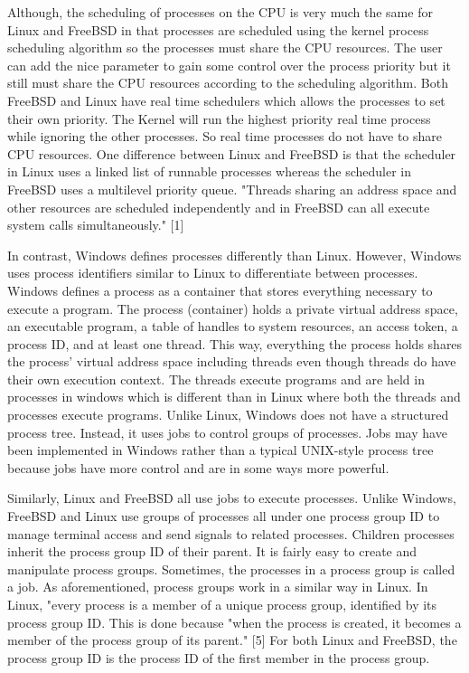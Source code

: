 \documentclass[letterpaper,10pt,draftclsnofoot,onecolumn,]{IEEEtran}
\begin{document}
Although, the scheduling of processes on the CPU is very much the same for Linux and FreeBSD in that processes are scheduled using the kernel process scheduling algorithm so the processes must share the CPU resources. The user can add the nice parameter to gain some control over the process priority but it still must share the CPU resources according to the scheduling algorithm. Both FreeBSD and Linux have real time schedulers which allows the processes to set their own priority. The Kernel will run the highest priority real time process while ignoring the other processes. So real time processes do not have to share CPU resources. One difference between Linux and FreeBSD is that the scheduler in Linux uses a linked list of runnable processes whereas the scheduler in FreeBSD uses a multilevel priority queue. "Threads sharing an address space and other resources are scheduled independently and in FreeBSD can all execute system calls simultaneously." [1] 

In contrast, Windows defines processes differently than Linux. However, Windows uses process identifiers similar to Linux to differentiate between processes. Windows defines a process as a container that stores everything necessary to execute a program. The process (container) holds a private virtual address space, an executable program, a table of handles to system resources, an access token, a process ID, and at least one thread. This way, everything the process holds shares the process' virtual address space including threads even though threads do have their own execution context. The threads execute programs and are held in processes in windows which is different than in Linux where both the threads and processes execute programs. Unlike Linux, Windows does not have a structured process tree. Instead, it uses jobs to control groups of processes. Jobs may have been implemented in Windows rather than a typical UNIX-style process tree because jobs have more control and are in some ways more powerful.

Similarly, Linux and FreeBSD all use jobs to execute processes. Unlike Windows, FreeBSD and Linux use groups of processes all under one process group ID to manage terminal access and send signals to related processes. Children processes inherit the process group ID of their parent. It is fairly easy to create and manipulate process groups. Sometimes, the processes in a process group is called a job. As aforementioned, process groups work in a similar way in Linux. In Linux, "every process is a member of a unique process group, identified by its process group ID. This is done because "when the process is created, it becomes a member of the process group of its parent." [5] For both Linux and FreeBSD, the process group ID is the process ID of the first member in the process group.
\end{document}
